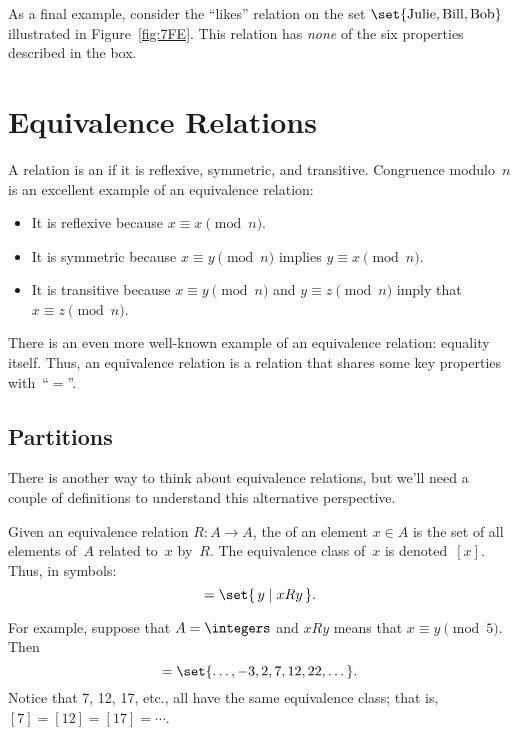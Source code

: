 As a final example, consider the ``likes'' relation on the set $\set{
  \text{Julie}, \text{Bill}, \text{Bob} }$ illustrated in
Figure~\ref{fig:7FE}.  This relation has \emph{none} of the six
properties described in the box.

\section{Equivalence Relations}

A relation is an  if it is reflexive,
symmetric, and transitive.  Congruence modulo~$n$ is an excellent
example of an equivalence relation:
\begin{itemize}

\item
It is reflexive because $x \equiv x \pmod{n}$.

\item
It is symmetric because $x \equiv y \pmod{n}$ implies $y \equiv x
\pmod{n}$.

\item
It is transitive because $x \equiv y \pmod{n}$ and $y \equiv z
\pmod{n}$ imply that $x \equiv z \pmod{n}$.

\end{itemize}
There is an even more well-known example of an equivalence relation:
equality itself.  Thus, an equivalence relation is a relation that
shares some key properties with~``$=$''.

\subsection{Partitions}

There is another way to think about equivalence relations, but we'll
need a couple of definitions to understand this alternative
perspective.

\begin{definition}\label{def:equiv_class}

Given an equivalence relation $R : A \to A$, the  of an element $x \in A$  is the set of all elements of~$A$
related to~$x$ by~$R$.  The equivalence class of~$x$ is
denoted~$[x]$.  Thus, in symbols:
\begin{equation*}
    [x] = \set{\, y \mid x R y \,}.
\end{equation*}
\end{definition}

For example, suppose that $A = \integers$ and $x R y$ means that $x
\equiv y \pmod{5}$.  Then
\begin{equation*}
    [7] = \set{ \dots, -3, 2, 7, 12, 22, \dots }.
\end{equation*}
Notice that 7, 12, 17, etc., all have the same equivalence class; that
is, $[7] = [12] = [17] = \cdots$.


